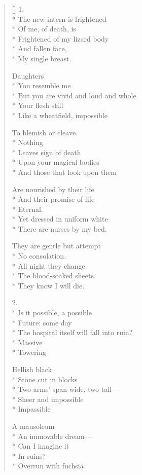 \label{ch:theknowledge}
\settowidth{\versewidth}{The hospital itself will fall into ruin?}
\begin{verse}[\versewidth]
1.\\*
The new intern is frightened\\*
Of me, of death, is\\*
Frightened of my lizard body\\*
And fallen face,\\*
My single breast.

Daughters\\*
You resemble me\\*
But you are vivid and loud and whole.\\*
Your flesh still\\*
Like a wheatfield, impossible

To blemish or cleave.\\*
Nothing\\*
Leaves sign of death\\*
Upon your magical bodies\\*
And those that look upon them

Are nourished by their life\\*
And their promise of life\\*
Eternal.\\*
Yet dressed in uniform white\\*
There are nurses by my bed.

They are gentle but attempt\\*
No consolation.\\*
All night they change\\*
The blood-soaked sheets.\\*
They know I will die.

2.\\*
Is it possible, a possible\\*
Future: some day\\*
The hospital itself will fall into ruin?\\*
Massive\\*
Towering

Hellish black\\*
Stone cut in blocks\\*
Two arms' span wide, two tall---\\*
Sheer and impossible\\*
Impassible

A mausoleum\\*
An immovable dream---\\*
Can I imagine it \\*
In ruins?\\*
Overrun with fuchsia


\end{verse}
